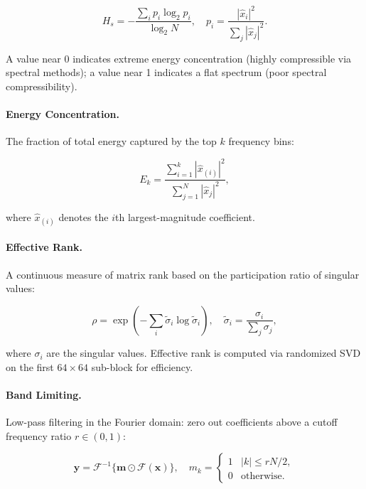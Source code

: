 \documentclass[11pt,a4paper,openright]{book}
\begin{document}
\begin{equation}
	\label{eq:spectral_entropy}
	H_s = -\frac{\sum_i p_i \log_2 p_i}{\log_2 N}, \quad p_i = \frac{|\hat{x}_i|^2}{\sum_j |\hat{x}_j|^2}.
\end{equation}

A value near 0 indicates extreme energy concentration (highly compressible via spectral methods); a value near 1 indicates a flat spectrum (poor spectral compressibility).

\paragraph{Energy Concentration.}
The fraction of total energy captured by the top $k$ frequency bins:

\begin{equation}
	\label{eq:energy_conc}
	E_k = \frac{\sum_{i=1}^k |\hat{x}_{(i)}|^2}{\sum_{j=1}^N |\hat{x}_j|^2},
\end{equation}

where $\hat{x}_{(i)}$ denotes the $i$th largest-magnitude coefficient.

\paragraph{Effective Rank.}
A continuous measure of matrix rank based on the participation ratio of singular values:

\begin{equation}
	\label{eq:eff_rank}
	\rho = \exp\left(-\sum_i \tilde{\sigma}_i \log \tilde{\sigma}_i\right), \quad \tilde{\sigma}_i = \frac{\sigma_i}{\sum_j \sigma_j},
\end{equation}

where $\sigma_i$ are the singular values. Effective rank is computed via randomized SVD on the first $64 \times 64$ sub-block for efficiency.

\paragraph{Band Limiting.}
Low-pass filtering in the Fourier domain: zero out coefficients above a cutoff frequency ratio $r \in (0, 1)$:

\begin{equation}
	\label{eq:band_limit}
	\mathbf{y} = \mathcal{F}^{-1}\{\mathbf{m} \odot \mathcal{F}(\mathbf{x})\}, \quad m_k = \begin{cases} 1 & |k| \le rN/2, \\ 0 & \text{otherwise.} \end{cases}
\end{equation}
\end{document}
